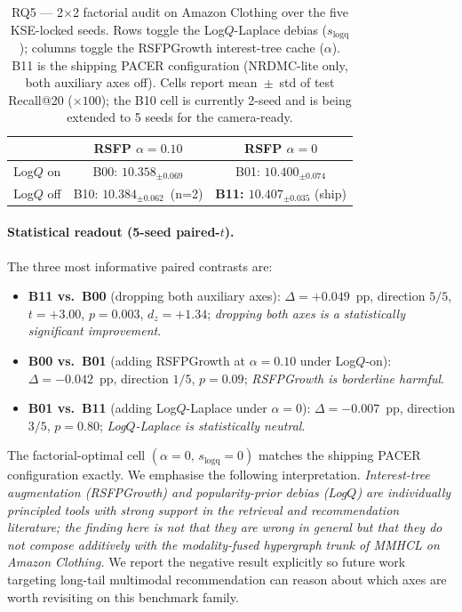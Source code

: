 \documentclass[conference]{IEEEtran}
\begin{document}
\begin{table}[!t]
\caption{RQ5 --- 2$\times$2 factorial audit on Amazon Clothing over
the five KSE-locked seeds. Rows toggle the Log$Q$-Laplace debias
($s_{\text{logq}}$); columns toggle the RSFPGrowth interest-tree
cache ($\alpha$). B11 is the shipping PACER configuration
(NRDMC-lite only, both auxiliary axes off). Cells report
mean~$\pm$~std of test Recall@20 ($\times 100$); the B10 cell is
currently 2-seed and is being extended to 5 seeds for the
camera-ready.}
\label{tab:factorial}
\centering
\renewcommand{\arraystretch}{1.10}
\setlength{\tabcolsep}{5pt}
\begin{tabular}{lcc}
\toprule
& RSFP $\alpha{=}0.10$ & RSFP $\alpha{=}0$ \\
\midrule
Log$Q$ on  & B00: $10.358_{\pm 0.069}$ & B01: $10.400_{\pm 0.074}$ \\
Log$Q$ off & B10: $10.384_{\pm 0.062}$~\scriptsize{(n=2)} & \textbf{B11: $\mathbf{10.407_{\pm 0.035}}$} (ship) \\
\bottomrule
\end{tabular}
\end{table}

\paragraph{Statistical readout (5-seed paired-$t$).}
The three most informative paired contrasts are:
\begin{itemize}[leftmargin=1.2em,itemsep=1pt,topsep=1pt]
\item \textbf{B11 vs.\ B00} (dropping both auxiliary axes):
$\Delta{=}+0.049$~pp, direction $5/5$, $t{=}+3.00$, $p{=}0.003$,
$d_z{=}+1.34$; \emph{dropping both axes is a statistically
significant improvement}.
\item \textbf{B00 vs.\ B01} (adding RSFPGrowth at $\alpha{=}0.10$
under Log$Q$-on):
$\Delta{=}-0.042$~pp, direction $1/5$, $p{=}0.09$;
\emph{RSFPGrowth is borderline harmful}.
\item \textbf{B01 vs.\ B11} (adding Log$Q$-Laplace under
$\alpha{=}0$):
$\Delta{=}-0.007$~pp, direction $3/5$, $p{=}0.80$;
\emph{Log$Q$-Laplace is statistically neutral}.
\end{itemize}
The factorial-optimal cell $(\alpha{=}0,\, s_{\text{logq}}{=}0)$
matches the shipping PACER configuration exactly. We emphasise the
following interpretation. \emph{Interest-tree augmentation
(RSFPGrowth) and popularity-prior debias (Log$Q$) are individually
principled tools with strong support in the retrieval and
recommendation literature; the finding here is not that they are
wrong in general but that they do not compose additively with the
modality-fused hypergraph trunk of MMHCL on Amazon Clothing.} We
report the negative result explicitly so future work targeting
long-tail multimodal recommendation can reason about which axes are
worth revisiting on this benchmark family.
\end{document}
